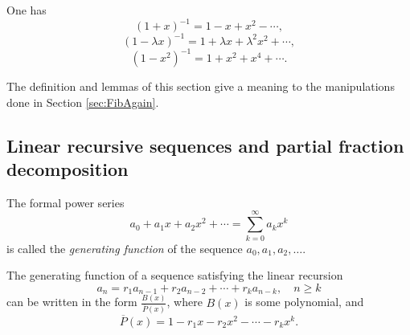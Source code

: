 \begin{page}

\begin{exl}
One has
\[
(1 + x)^{-1} = 1 - x + x^2 - \cdots,
\]
\[
(1 - \lambda x)^{-1} = 1 + \lambda x + \lambda^2 x^2 + \cdots,
\]
\[
(1 - x^2)^{-1} = 1 + x^2 + x^4 + \cdots.
\]
\end{exl}

\end{page}

\begin{page}



The definition and lemmas of this section give a meaning to the manipulations done in Section \ref{sec:FibAgain}.




\end{page}

\begin{page}

\subsection{Linear recursive sequences and partial fraction decomposition}

\end{page}

\begin{page}

\begin{dfn}
The formal power series
\[
a_0 + a_1 x + a_2 x^2 + \cdots = \sum_{k=0}^\infty a_k x^k
\]
is called the \emph{generating function} of the sequence $a_0, a_1, a_2, \ldots$.
\end{dfn}

\end{page}

\begin{page}

\begin{thm}
The generating function of a sequence satisfying the linear recursion
\[
a_n = r_1 a_{n-1} + r_2 a_{n-2} + \cdots + r_k a_{n-k}, \quad n \ge k
\]
can be written in the form $\frac{B(x)}{\overline{P}(x)}$, where $B(x)$ is some polynomial, and
\[
\overline{P}(x) = 1 - r_1 x - r_2 x^2 - \cdots - r_k x^k.
\]
\end{thm}

\end{page}

